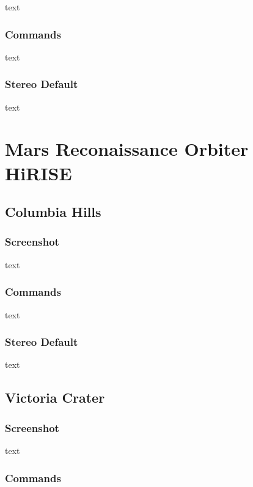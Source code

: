 text

\subsubsection*{Commands}

text

\subsubsection*{Stereo Default}

text

\section{Mars Reconaissance Orbiter HiRISE}

\subsection{Columbia Hills}

\subsubsection*{Screenshot}

text

\subsubsection*{Commands}

text

\subsubsection*{Stereo Default}

text

\subsection{Victoria Crater}

\subsubsection*{Screenshot}

text

\subsubsection*{Commands}

